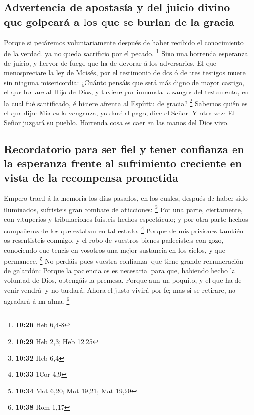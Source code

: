 \hypertarget{advertencia-de-apostasuxeda-y-del-juicio-divino-que-golpearuxe1-a-los-que-se-burlan-de-la-gracia}{%
\subsection{Advertencia de apostasía y del juicio divino que golpeará a
los que se burlan de la
gracia}\label{advertencia-de-apostasuxeda-y-del-juicio-divino-que-golpearuxe1-a-los-que-se-burlan-de-la-gracia}}

 Porque si pecáremos voluntariamente después de haber
recibido el conocimiento de la verdad, ya no queda sacrificio por el
pecado. \footnote{\textbf{10:26} Heb 6,4-8}  Sino una
horrenda esperanza de juicio, y hervor de fuego que ha de devorar á los
adversarios.  El que menospreciare la ley de Moisés, por el
testimonio de dos ó de tres testigos muere sin ninguna misericordia:
 ¿Cuánto pensáis que será más digno de mayor castigo, el
que hollare al Hijo de Dios, y tuviere por inmunda la sangre del
testamento, en la cual fué santificado, é hiciere afrenta al Espíritu de
gracia? \footnote{\textbf{10:29} Heb 2,3; Heb 12,25} 
Sabemos quién es el que dijo: Mía es la venganza, yo daré el pago, dice
el Señor. Y otra vez: El Señor juzgará su pueblo.  Horrenda
cosa es caer en las manos del Dios vivo.

\hypertarget{recordatorio-para-ser-fiel-y-tener-confianza-en-la-esperanza-frente-al-sufrimiento-creciente-en-vista-de-la-recompensa-prometida}{%
\subsection{Recordatorio para ser fiel y tener confianza en la esperanza
frente al sufrimiento creciente en vista de la recompensa
prometida}\label{recordatorio-para-ser-fiel-y-tener-confianza-en-la-esperanza-frente-al-sufrimiento-creciente-en-vista-de-la-recompensa-prometida}}

 Empero traed á la memoria los días pasados, en los cuales,
después de haber sido iluminados, sufristeis gran combate de
aflicciones: \footnote{\textbf{10:32} Heb 6,4}  Por una
parte, ciertamente, con vituperios y tribulaciones fuisteis hechos
espectáculo; y por otra parte hechos compañeros de los que estaban en
tal estado. \footnote{\textbf{10:33} 1Cor 4,9}  Porque de
mis prisiones también os resentisteis conmigo, y el robo de vuestros
bienes padecisteis con gozo, conociendo que tenéis en vosotros una mejor
sustancia en los cielos, y que permanece. \footnote{\textbf{10:34} Mat
  6,20; Mat 19,21; Mat 19,29}  No perdáis pues vuestra
confianza, que tiene grande remuneración de galardón: 
Porque la paciencia os es necesaria; para que, habiendo hecho la
voluntad de Dios, obtengáis la promesa.  Porque aun un
poquito, y el que ha de venir vendrá, y no tardará.  Ahora
el justo vivirá por fe; mas si se retirare, no agradará á mi alma.
\footnote{\textbf{10:38} Rom 1,17}

